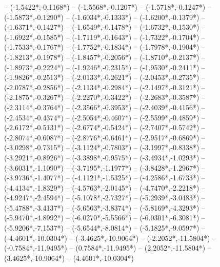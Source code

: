{	-- ({-1.5422*\dx},{-0.1168*\dy})
	-- ({-1.5568*\dx},{-0.1207*\dy})
	-- ({-1.5718*\dx},{-0.1247*\dy})
	-- ({-1.5873*\dx},{-0.1290*\dy})
	-- ({-1.6034*\dx},{-0.1333*\dy})
	-- ({-1.6200*\dx},{-0.1379*\dy})
	-- ({-1.6371*\dx},{-0.1427*\dy})
	-- ({-1.6549*\dx},{-0.1478*\dy})
	-- ({-1.6732*\dx},{-0.1530*\dy})
	-- ({-1.6922*\dx},{-0.1585*\dy})
	-- ({-1.7119*\dx},{-0.1643*\dy})
	-- ({-1.7322*\dx},{-0.1704*\dy})
	-- ({-1.7533*\dx},{-0.1767*\dy})
	-- ({-1.7752*\dx},{-0.1834*\dy})
	-- ({-1.7978*\dx},{-0.1904*\dy})
	-- ({-1.8213*\dx},{-0.1978*\dy})
	-- ({-1.8457*\dx},{-0.2056*\dy})
	-- ({-1.8710*\dx},{-0.2137*\dy})
	-- ({-1.8973*\dx},{-0.2224*\dy})
	-- ({-1.9246*\dx},{-0.2315*\dy})
	-- ({-1.9530*\dx},{-0.2411*\dy})
	-- ({-1.9826*\dx},{-0.2513*\dy})
	-- ({-2.0133*\dx},{-0.2621*\dy})
	-- ({-2.0453*\dx},{-0.2735*\dy})
	-- ({-2.0787*\dx},{-0.2856*\dy})
	-- ({-2.1134*\dx},{-0.2984*\dy})
	-- ({-2.1497*\dx},{-0.3121*\dy})
	-- ({-2.1875*\dx},{-0.3267*\dy})
	-- ({-2.2270*\dx},{-0.3422*\dy})
	-- ({-2.2683*\dx},{-0.3587*\dy})
	-- ({-2.3114*\dx},{-0.3764*\dy})
	-- ({-2.3566*\dx},{-0.3953*\dy})
	-- ({-2.4039*\dx},{-0.4156*\dy})
	-- ({-2.4534*\dx},{-0.4374*\dy})
	-- ({-2.5054*\dx},{-0.4607*\dy})
	-- ({-2.5599*\dx},{-0.4859*\dy})
	-- ({-2.6172*\dx},{-0.5131*\dy})
	-- ({-2.6774*\dx},{-0.5424*\dy})
	-- ({-2.7407*\dx},{-0.5742*\dy})
	-- ({-2.8074*\dx},{-0.6087*\dy})
	-- ({-2.8776*\dx},{-0.6461*\dy})
	-- ({-2.9517*\dx},{-0.6869*\dy})
	-- ({-3.0298*\dx},{-0.7315*\dy})
	-- ({-3.1124*\dx},{-0.7803*\dy})
	-- ({-3.1997*\dx},{-0.8338*\dy})
	-- ({-3.2921*\dx},{-0.8926*\dy})
	-- ({-3.3898*\dx},{-0.9575*\dy})
	-- ({-3.4934*\dx},{-1.0293*\dy})
	-- ({-3.6031*\dx},{-1.1090*\dy})
	-- ({-3.7195*\dx},{-1.1977*\dy})
	-- ({-3.8428*\dx},{-1.2967*\dy})
	-- ({-3.9736*\dx},{-1.4077*\dy})
	-- ({-4.1121*\dx},{-1.5325*\dy})
	-- ({-4.2586*\dx},{-1.6733*\dy})
	-- ({-4.4134*\dx},{-1.8329*\dy})
	-- ({-4.5763*\dx},{-2.0145*\dy})
	-- ({-4.7470*\dx},{-2.2218*\dy})
	-- ({-4.9247*\dx},{-2.4594*\dy})
	-- ({-5.1078*\dx},{-2.7327*\dy})
	-- ({-5.2939*\dx},{-3.0483*\dy})
	-- ({-5.4788*\dx},{-3.4137*\dy})
	-- ({-5.6563*\dx},{-3.8374*\dy})
	-- ({-5.8169*\dx},{-4.3293*\dy})
	-- ({-5.9470*\dx},{-4.8992*\dy})
	-- ({-6.0270*\dx},{-5.5566*\dy})
	-- ({-6.0301*\dx},{-6.3081*\dy})
	-- ({-5.9206*\dx},{-7.1537*\dy})
	-- ({-5.6544*\dx},{-8.0814*\dy})
	-- ({-5.1825*\dx},{-9.0597*\dy})
	-- ({-4.4601*\dx},{-10.0304*\dy})
	-- ({-3.4625*\dx},{-10.9064*\dy})
	-- ({-2.2052*\dx},{-11.5804*\dy})
	-- ({-0.7584*\dx},{-11.9495*\dy})
	-- ({0.7584*\dx},{-11.9495*\dy})
	-- ({2.2052*\dx},{-11.5804*\dy})
	-- ({3.4625*\dx},{-10.9064*\dy})
	-- ({4.4601*\dx},{-10.0304*\dy})
}
